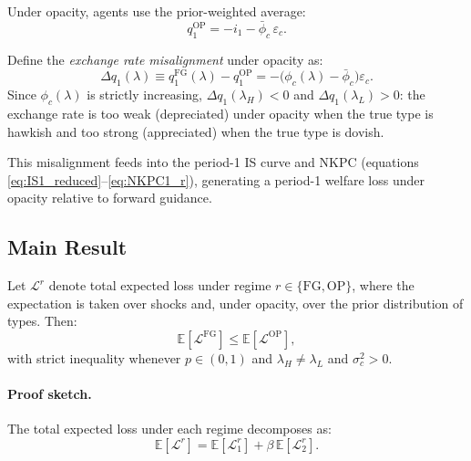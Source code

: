 Under opacity, agents use the prior-weighted average:
\begin{equation}
  q_1^{\mathrm{OP}} = -i_1 - \bar{\phi}_c\,\varepsilon_c.
  \label{eq:q1_OP}
\end{equation}

Define the \emph{exchange rate misalignment} under opacity as:
\begin{equation}
  \Delta q_1(\lambda) \equiv q_1^{\mathrm{FG}}(\lambda) - q_1^{\mathrm{OP}}
    = -\bigl(\phi_c(\lambda) - \bar{\phi}_c\bigr)\varepsilon_c.
  \label{eq:misalignment}
\end{equation}
Since $\phi_c(\lambda)$ is strictly increasing, $\Delta q_1(\lambda_H) < 0$ and
$\Delta q_1(\lambda_L) > 0$: the exchange rate is too weak (depreciated) under opacity
when the true type is hawkish and too strong (appreciated) when the true type is dovish.

This misalignment feeds into the period-1 IS curve and NKPC (equations
\eqref{eq:IS1_reduced}--\eqref{eq:NKPC1_r}), generating a period-1 welfare loss under
opacity relative to forward guidance.

\subsection{Main Result}

\begin{proposition}
\label{prop:welfare}
Let $\mathcal{L}^r$ denote total expected loss under regime $r \in \{\mathrm{FG},
\mathrm{OP}\}$, where the expectation is taken over shocks and, under opacity, over
the prior distribution of types. Then:
\begin{equation}
  \mathbb{E}[\mathcal{L}^{\mathrm{FG}}] \leq \mathbb{E}[\mathcal{L}^{\mathrm{OP}}],
  \label{eq:welfare_result}
\end{equation}
with strict inequality whenever $p \in (0,1)$ and $\lambda_H \neq \lambda_L$ and
$\sigma_c^2 > 0$.
\end{proposition}

\paragraph{Proof sketch.}
The total expected loss under each regime decomposes as:
\begin{equation}
  \mathbb{E}[\mathcal{L}^r]
    = \mathbb{E}[\mathcal{L}_1^r] + \beta\,\mathbb{E}[\mathcal{L}_2^r].
  \label{eq:total_loss_decomp}
\end{equation}

